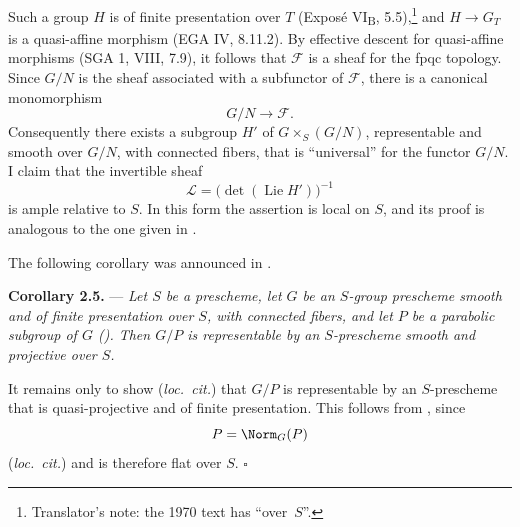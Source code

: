 Such a group \(H\) is of finite presentation over \(T\)
(Exposé VI\textsubscript{B}, 5.5),\footnote{Translator's note: the 1970 text has ``over~\(S\)''.} and
\(H\to G_T\) is a quasi-affine morphism (EGA IV, 8.11.2).
By effective descent for quasi-affine morphisms (SGA 1, VIII, 7.9),
it follows that \(\mathscr F\) is a sheaf for the fpqc topology.
Since \(G/N\) is the sheaf associated with a subfunctor of
\(\mathscr F\), there is a canonical monomorphism
\[
  G/N\longrightarrow\mathscr F.
\]
Consequently there exists a subgroup \(H'\) of
\(G\times_S(G/N)\), representable and smooth over \(G/N\), with
connected fibers, that is ``universal'' for the functor \(G/N\).
I claim that the invertible sheaf
\[
  \mathscr L=\bigl(\det(\operatorname{Lie}H')\bigr)^{-1}
\]
is ample relative to \(S\). In this form the assertion is local on
\(S\), and its proof is analogous to the one given in .

The following corollary was announced in .

\medskip
\noindent{}%
\textbf{Corollary 2.5.} --- \textit{Let \(S\) be a prescheme, let
\(G\) be an \(S\)-group prescheme smooth and of finite presentation
over \(S\), with connected fibers, and let \(P\) be a parabolic
subgroup of \(G\) (). Then \(G/P\) is
representable by an \(S\)-prescheme smooth and projective over
\(S\).}

It remains only to show (\textit{loc.\ cit.}) that \(G/P\) is
representable by an \(S\)-prescheme that is quasi-projective and of
finite presentation. This follows from , since
\[
  P=\Norm_G(P)
\]
(\textit{loc.\ cit.}) and is therefore flat over \(S\).
\hfill\(\square\)
